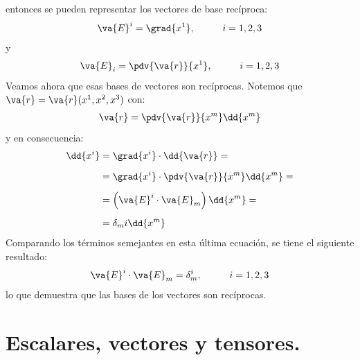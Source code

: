 entonces se pueden representar los vectores de base recíproca:
\begin{align}
\va{E}^{i} = \grad{x^{1}}, \hspace{1cm} i = 1, 2, 3
\label{eq:ecuacion_02_25}
\end{align}
y
\begin{align}
\va{E}_{i} = \pdv{\va{r}}{x^{1}}, \hspace{1cm} i = 1, 2, 3
\label{eq:ecuacion_02_26}
\end{align}
Veamos ahora que esas bases de vectores son recíprocas. \hfill \break Notemos que $\va{r} = \va{r} (x^{1}, x^{2}, x^{3})$ con:
\begin{align}
\va{r} = \pdv{\va{r}}{x^{m}} \dd{x^{m}}
\label{eq:ecuacion_02_27}
\end{align}
y en consecuencia:
\begin{align}
\begin{aligned}[b]
\dd{x^{i}} &= \grad{x^{i}} \cdot \dd{\va{r}} = \\[0.5em]
&= \grad{x^{i}} \cdot \pdv{\va{r}}{x^{m}} \dd{x^{m}} = \\[0.5em]
&= \left( \va{E}^{i} \cdot \va{E}_{m} \right) \dd{x^{m}} = \\[0.5em]
&= \delta_{m}{i} \dd{x^{m}}
\end{aligned}
\label{eq:ecuacion_02_28}
\end{align}
Comparando los términos semejantes en esta última ecuación, se tiene el siguiente resultado:
\begin{align*}
\va{E}^{i} \cdot \va{E}_{m} = \delta_{m}^{i}, \hspace{1cm} i = 1, 2, 3
\end{align*}
lo que demuestra que las bases de los vectores son recíprocas.

\section{Escalares, vectores y tensores.}


